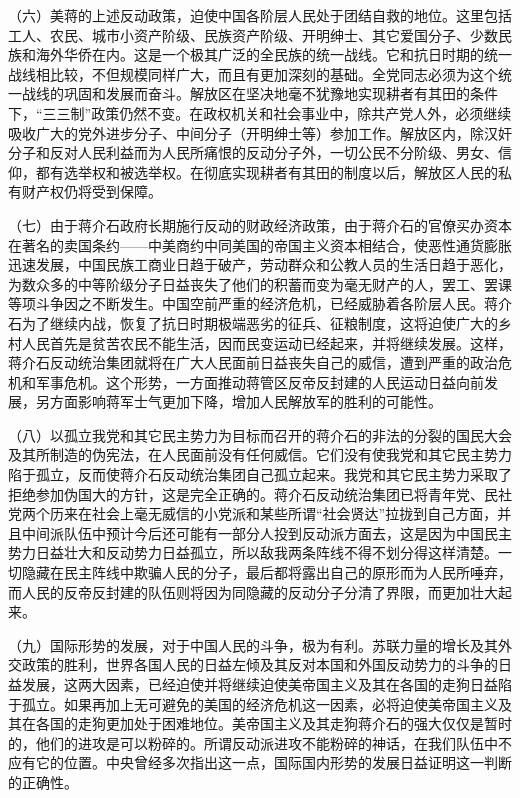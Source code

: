 （六）美蒋的上述反动政策，迫使中国各阶层人民处于团结自救的地位。这里包括工人、农民、城市小资产阶级、民族资产阶级、开明绅士、其它爱国分子、少数民族和海外华侨在内。这是一个极其广泛的全民族的统一战线。它和抗日时期的统一战线相比较，不但规模同样广大，而且有更加深刻的基础。全党同志必须为这个统一战线的巩固和发展而奋斗。解放区在坚决地毫不犹豫地实现耕者有其田的条件下，“三三制”政策仍然不变。在政权机关和社会事业中，除共产党人外，必须继续吸收广大的党外进步分子、中间分子（开明绅士等）参加工作。解放区内，除汉奸分子和反对人民利益而为人民所痛恨的反动分子外，一切公民不分阶级、男女、信仰，都有选举权和被选举权。在彻底实现耕者有其田的制度以后，解放区人民的私有财产权仍将受到保障。

（七）由于蒋介石政府长期施行反动的财政经济政策，由于蒋介石的官僚买办资本在著名的卖国条约——中美商约中同美国的帝国主义资本相结合，使恶性通货膨胀迅速发展，中国民族工商业日趋于破产，劳动群众和公教人员的生活日趋于恶化，为数众多的中等阶级分子日益丧失了他们的积蓄而变为毫无财产的人，罢工、罢课等项斗争因之不断发生。中国空前严重的经济危机，已经威胁着各阶层人民。蒋介石为了继续内战，恢复了抗日时期极端恶劣的征兵、征粮制度，这将迫使广大的乡村人民首先是贫苦农民不能生活，因而民变运动已经起来，并将继续发展。这样，蒋介石反动统治集团就将在广大人民面前日益丧失自己的威信，遭到严重的政治危机和军事危机。这个形势，一方面推动蒋管区反帝反封建的人民运动日益向前发展，另方面影响蒋军士气更加下降，增加人民解放军的胜利的可能性。

（八）以孤立我党和其它民主势力为目标而召开的蒋介石的非法的分裂的国民大会及其所制造的伪宪法，在人民面前没有任何威信。它们没有使我党和其它民主势力陷于孤立，反而使蒋介石反动统治集团自己孤立起来。我党和其它民主势力采取了拒绝参加伪国大的方针，这是完全正确的。蒋介石反动统治集团已将青年党、民社党两个历来在社会上毫无威信的小党派和某些所谓“社会贤达”拉拢到自己方面，并且中间派队伍中预计今后还可能有一部分人投到反动派方面去，这是因为中国民主势力日益壮大和反动势力日益孤立，所以敌我两条阵线不得不划分得这样清楚。一切隐藏在民主阵线中欺骗人民的分子，最后都将露出自己的原形而为人民所唾弃，而人民的反帝反封建的队伍则将因为同隐藏的反动分子分清了界限，而更加壮大起来。

（九）国际形势的发展，对于中国人民的斗争，极为有利。苏联力量的增长及其外交政策的胜利，世界各国人民的日益左倾及其反对本国和外国反动势力的斗争的日益发展，这两大因素，已经迫使并将继续迫使美帝国主义及其在各国的走狗日益陷于孤立。如果再加上无可避免的美国的经济危机这一因素，必将迫使美帝国主义及其在各国的走狗更加处于困难地位。美帝国主义及其走狗蒋介石的强大仅仅是暂时的，他们的进攻是可以粉碎的。所谓反动派进攻不能粉碎的神话，在我们队伍中不应有它的位置。中央曾经多次指出这一点，国际国内形势的发展日益证明这一判断的正确性。

